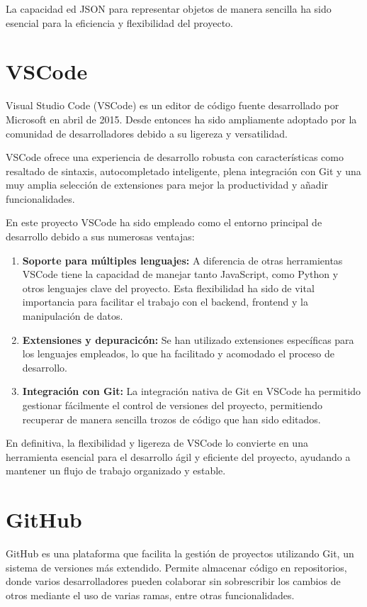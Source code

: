 \documentclass[a4paper, 12pt]{book}
\begin{document}
La capacidad ed JSON para representar objetos de manera sencilla ha sido esencial para la eficiencia y flexibilidad del proyecto.

\section{VSCode}
Visual Studio Code (VSCode) es un editor de código fuente desarrollado por Microsoft en abril de 2015. Desde entonces ha sido ampliamente adoptado por la comunidad de desarrolladores debido a su ligereza y versatilidad.

VSCode ofrece una experiencia de desarrollo robusta con características como resaltado de sintaxis, autocompletado inteligente, plena integración con Git y una muy amplia selección de extensiones para mejor la productividad y añadir funcionalidades.

En este proyecto VSCode ha sido empleado como el entorno principal de desarrollo debido a sus numerosas ventajas:

\begin{enumerate}
    \item \textbf{Soporte para múltiples lenguajes: } A diferencia de otras herramientas VSCode tiene la capacidad de manejar tanto JavaScript, como Python y otros lenguajes clave del proyecto. Esta flexibilidad ha sido de vital importancia para facilitar el trabajo con el backend, frontend y la manipulación de datos.
    \item \textbf{Extensiones y depuracicón: } Se han utilizado extensiones específicas para los lenguajes empleados, lo que ha facilitado y acomodado el proceso de desarrollo.
    \item \textbf{Integración con Git: } La integración nativa de Git en VSCode ha permitido gestionar fácilmente el control de versiones del proyecto, permitiendo recuperar de manera sencilla trozos de código que han sido editados.
\end{enumerate}

En definitiva, la flexibilidad y ligereza de VSCode lo convierte en una herramienta esencial para el desarrollo ágil y eficiente del proyecto, ayudando a mantener un flujo de trabajo organizado y estable.

\section{GitHub}

GitHub es una plataforma que facilita la gestión de proyectos utilizando Git, un sistema de versiones más extendido. Permite almacenar código en repositorios, donde varios desarrolladores pueden colaborar sin sobrescribir los cambios de otros mediante el uso de varias ramas, entre otras funcionalidades. 
\end{document}
